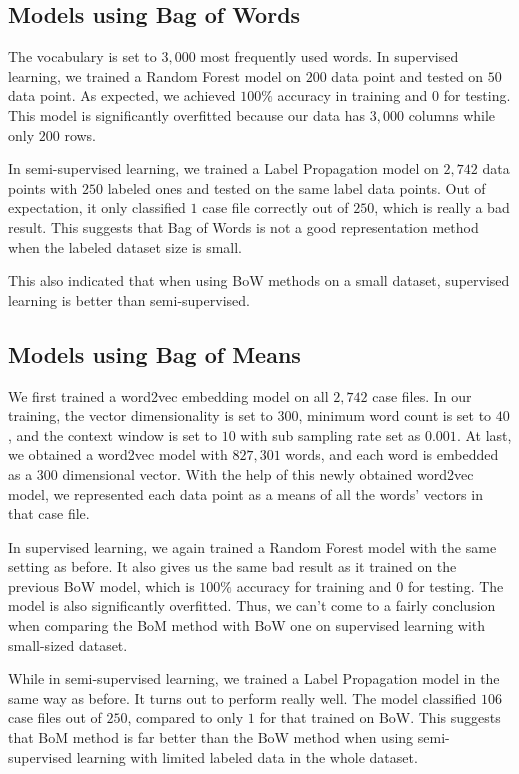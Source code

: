 \documentclass[11pt]{article}
\begin{document}
\subsection{Models using Bag of Words}
The vocabulary is set to $3,000$ most frequently used words. In supervised learning, we trained a Random Forest model on $200$ data point and tested on $50$ data point. As expected, we achieved $100\%$ accuracy in training and $0$ for testing. This model is significantly overfitted because our data has $3,000$ columns while only $200$ rows.

In semi-supervised learning, we trained a Label Propagation model on $2,742$ data points with $250$ labeled ones and tested on the same label data points. Out of expectation, it only classified $1$ case file correctly out of $250$, which is really a bad result. This suggests that Bag of Words is not a good representation method when the labeled dataset size is small.

This also indicated that when using BoW methods on a small dataset, supervised learning is better than semi-supervised.

\subsection{Models using Bag of Means}

We first trained a word2vec embedding model on all $2,742$ case files. In our training, the vector dimensionality is set to $300$, minimum word count is set to $40$, and the context window is set to $10$ with sub sampling rate set as $0.001$. At last, we obtained a word2vec model with $827,301$ words, and each word is embedded as a $300$ dimensional vector. With the help of this newly obtained word2vec model, we represented each data point as a means of all the words' vectors in that case file.

In supervised learning, we again trained a Random Forest model with the same setting as before. It also gives us the same bad result as it trained on the previous BoW model, which is $100\%$ accuracy for training and $0$ for testing. The model is also significantly overfitted. Thus, we can't come to a fairly conclusion when comparing the BoM method with BoW one on supervised learning with small-sized dataset.

While in semi-supervised learning, we trained a Label Propagation model in the same way as before. It turns out to perform really well. The model classified  $106$ case files out of $250$, compared to only $1$ for that trained on BoW. This suggests that BoM method is far better than the BoW method when using semi-supervised learning with limited labeled data in the whole dataset.
\end{document}
